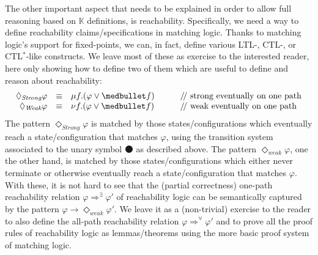 \documentclass[UTF8,11pt]{article}
\theoremstyle{plain}
\theoremstyle{definition}
\theoremstyle{remark}
\newcommand{\K}{\mbox{$\mathbb{K}$}\xspace}
\newcommand{\snext}{{\medbullet}}
\newcommand{\doubleslash}{/\!/{ }}
\begin{document}
The other important aspect that needs to be explained in order to allow
full reasoning based on \K definitions, is reachability.
Specifically, we need a way to define reachability claims/specifications
in matching logic.
Thanks to matching logic's support for fixed-points, we can, in fact,
define various LTL-, CTL-, or CTL$^*$-like constructs.
We leave most of these as exercise to the interested reader,
here only showing how to define two of them which are useful to define
and reason about reachability:
$$
\begin{array}{rcl@{\hspace*{7ex}}l}
\Diamond_{\textit{Strong}} \varphi & \equiv & \mu f . (\varphi \vee \snext f)
& \textrm{\doubleslash strong eventually on one path}
\\
\Diamond_{\textit{Weak}} \varphi & \equiv & \nu f . (\varphi \vee \snext f)
& \textrm{\doubleslash weak eventually on one path}
\end{array}
$$
The pattern $\Diamond_{\textit{Strong}}\varphi$ is matched by those
states/configurations which eventually reach a state/configuration that
matches $\varphi$, using the transition system associated to the unary
symbol $\snext$ as described above.
The pattern $\Diamond_{\textit{weak}}\varphi$, one the other hand, is matched
by those states/configurations which either never terminate or otherwise
eventually reach a state/configuration that matches $\varphi$.
With these, it is not hard to see that the (partial correctness) one-path
reachability relation $\varphi \Rightarrow^\exists \varphi'$ of reachability
logic \cite{stefanescu-park-yuwen-li-rosu-2016-oopsla} can be semantically
captured by the pattern
$\varphi \rightarrow \Diamond_{\textit{weak}}\varphi'$.
We leave it as a (non-trivial) exercise to the reader to also define the
all-path reachability relation $\varphi \Rightarrow^\forall\varphi'$ and to
prove all the proof rules of reachability logic as lemmas/theorems using the
more basic proof system of matching logic.
\end{document}

